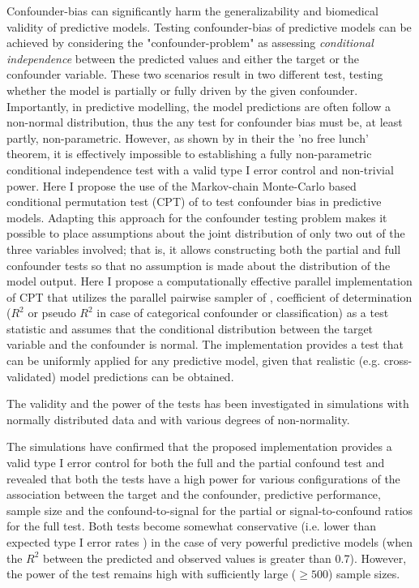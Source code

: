 \documentclass{article}
\begin{document}
Confounder-bias can significantly harm the generalizability and biomedical validity of predictive models. Testing confounder-bias of predictive models can be achieved by considering the "confounder-problem" as assessing \emph{conditional independence} between the predicted values and either the target or the confounder variable. These two scenarios result in two different test, testing whether the model is partially or fully driven by the given confounder.
Importantly, in predictive modelling, the model predictions are often follow a non-normal distribution, thus the any test for confounder bias must be, at least partly, non-parametric.
However, as shown by in \citet{shah2020hardness} their the 'no free lunch' theorem, it is effectively impossible to establishing a fully non-parametric conditional independence test with a valid type I error control and non-trivial power.
Here I propose the use of the Markov-chain Monte-Carlo based conditional permutation test (CPT) of \cite{berrett2020conditional} to test confounder bias in predictive models. Adapting this approach for the confounder testing problem makes it possible to place assumptions about the joint distribution of only two out of the three variables involved; that is, it allows constructing both the partial and full confounder tests so that no assumption is made about the distribution of the model output. 
Here I propose a computationally effective parallel implementation of CPT that utilizes the parallel pairwise sampler of \cite{berrett2020conditional}, coefficient of determination ($R^2$ or pseudo $R^2$ in case of categorical confounder or classification) as a test statistic and assumes that the conditional distribution between the target variable and the confounder is normal. The implementation provides a test that can be uniformly applied for any predictive model, given that realistic (e.g. cross-validated) model predictions can be obtained.

The validity and the power of the tests has been investigated in simulations with normally distributed data and with various degrees of non-normality.

The simulations have confirmed that the proposed implementation provides a valid type I error control for both the full and the partial confound test and revealed that both the tests have a high power for various configurations of the association between the target and the confounder, predictive performance, sample size and the confound-to-signal for the partial or signal-to-confound ratios for the full test. 
Both tests become somewhat conservative (i.e. lower than expected type I error rates ) in the case of very powerful predictive models (when the $R^2$ between the predicted and observed values is greater than 0.7). However, the power of the test remains high with sufficiently large ($\ge 500$) sample sizes.
\end{document}
